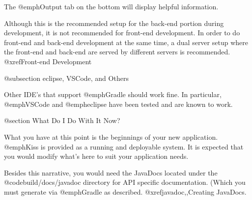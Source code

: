 The @emph{Output} tab on the bottom will display helpful information.


Although this is the recommended setup for the back-end portion during
development, it is not recommended for front-end development.  In
order to do front-end and back-end development at the same time, a
dual server setup where the front-end and back-end are served by
different servers is recommended.  @xref{Front-end Development}



@subsection eclipse, VSCode, and Others

Other IDE's that support @emph{Gradle} should work fine.  In
particular, @emph{VSCode} and @emph{eclipse} have been tested and are
known to work.

@section What Do I Do With It Now?

What you have at this point is the beginnings of your new application.
@emph{Kiss} is provided as a running and deployable system.  It is
expected that you would modify what's here to suit your application
needs.

Besides this narrative, you would need the JavaDocs located under the
@code{build/docs/javadoc} directory for API specific documentation.
(Which you must generate via @emph{Gradle} as described. @xref{javadoc,,Creating JavaDocs}.
